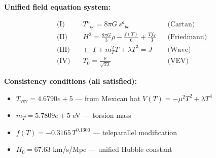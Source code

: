 
\textbf{Unified field equation system:}

\begin{align}
  \text{(I)} \quad & T^a{}_{bc} = 8\pi G \, s^a{}_{bc} && \text{(Cartan)} \\
  \text{(II)} \quad & H^2 = \frac{8\pi G}{3}\rho - \frac{f(T)}{6} + \frac{Tf_T}{3} && \text{(Friedmann)} \\
  \text{(III)} \quad & \Box T + m_T^2 T + \lambda T^3 = J && \text{(Wave)} \\
  \text{(IV)} \quad & T_0 = \frac{\mu}{\sqrt{2\lambda}} && \text{(VEV)}
\end{align}

\textbf{Consistency conditions (all satisfied):}
\begin{itemize}
  \item $T_{\text{vev}} = 4.6790e+5$ — from Mexican hat $V(T) = -\mu^2 T^2 + \lambda T^4$
  \item $m_T = 5.7809e+5$ eV — torsion mass
  \item $f(T) = -0.3165 \, T^{0.1300}$ — teleparallel modification
  \item $H_0 = 67.63$ km/s/Mpc — unified Hubble constant
\end{itemize}